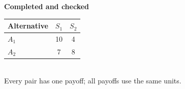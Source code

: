 \begin{tcolorbox}[colback=white,colframe=motblue,boxrule=0.8pt,arc=2mm]
\begin{minipage}[t]{0.59\textwidth}
			{\scriptsize\textbf{Completed and checked}}
			\begin{center}
				\scriptsize
				\begin{tabular}{lcc}
					\toprule
					Alternative & $S_1$ & $S_2$ \\
					\midrule
					$A_1$ & 10 & 4 \\
					$A_2$ & 7 & 8 \\
					\bottomrule
				\end{tabular}\\[-1mm]
				{\vspace{3mm}
					\tiny Every pair has one payoff; all payoffs use the same units.}
			\end{center}
		\end{minipage}
	\end{tcolorbox}
	
	\vspace{2mm}
	
